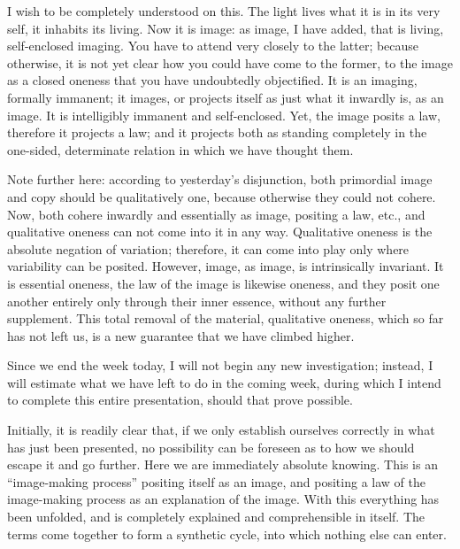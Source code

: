 I wish to be completely understood on this.
The light lives what it is
in its very self,
it inhabits its living.
Now it is image:
as image, I have added,
that is living, self-enclosed imaging.
You have to attend very closely to the latter;
because otherwise, it is not yet clear
how you could have come to the former,
to the image as a closed oneness
that you have undoubtedly objectified.
It is an imaging, formally immanent;
it images, or projects itself as
just what it inwardly is, as an image.
It is intelligibly immanent and self-enclosed.
Yet, the image posits a law,
therefore it projects a law;
and it projects both as
standing completely in
the one-sided, determinate relation
in which we have thought them.

Note further here: according to yesterday's disjunction,
both primordial image and copy should be qualitatively one,
because otherwise they could not cohere.
Now, both cohere inwardly and essentially
as image, positing a law, etc.,
and qualitative oneness can not come
into it in any way.
Qualitative oneness is the absolute negation of variation;
therefore, it can come into play only
where variability can be posited.
However, image, as image, is intrinsically invariant.
It is essential oneness,
the law of the image is likewise oneness,
and they posit one another entirely
only through their inner essence,
without any further supplement.
This total removal of the material, qualitative oneness,
which so far has not left us,
is a new guarantee that we have climbed higher.

Since we end the week today, I will not begin any new investigation;
instead, I will estimate what we have left to do in the coming week,
during which I intend to complete this entire presentation,
should that prove possible.

Initially, it is readily clear that,
if we only establish ourselves correctly in
what has just been presented,
no possibility can be foreseen as to
how we should escape it and go further.
Here we are immediately absolute knowing.
This is an “image-making process”
positing itself as an image,
and positing a law of the image-making process
as an explanation of the image.
With this everything has been unfolded, and
is completely explained and comprehensible in itself.
The terms come together to form a synthetic cycle,
into which nothing else can enter.

